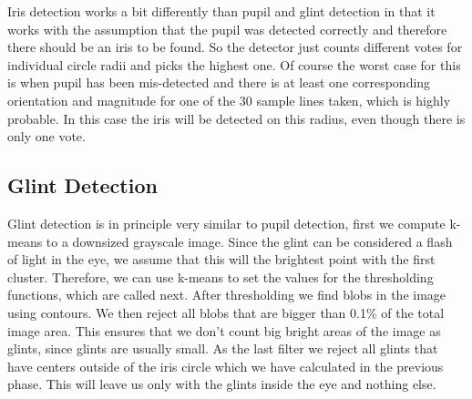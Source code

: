 Iris detection works a bit differently than pupil and glint detection in that it works with the assumption that the pupil was detected correctly and therefore there should be an iris to be found. So the detector just counts different votes for individual circle radii and picks the highest one. Of course the worst case for this is when pupil has been mis-detected and there is at least one corresponding orientation and magnitude for one of the 30 sample lines taken, which is highly probable. In this case the iris will be detected on this radius, even though there is only one vote.


\subsection{Glint Detection}

Glint detection is in principle very similar to pupil detection, first we compute k-means to a downsized grayscale image. Since the glint can be considered a flash of light in the eye, we assume that this will the brightest point with the first cluster. 
Therefore, we can use k-means to set the values for the thresholding functions, which are called next. After thresholding we find blobs in the image using contours. We then reject all blobs that are bigger than 0.1\% of the total image area. This ensures that we don't count big bright areas of the image as glints, since glints are usually small. As the last filter we reject all glints that have centers outside of the iris circle which we have calculated in the previous phase. This will leave us only with the glints inside the eye and nothing else.

